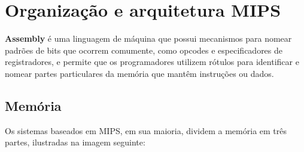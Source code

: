 \documentclass[
	12pt,				%
	oneside,			%
	a4paper,			%
	english,			%
	brazil				%
	]{abntex2ppgsi}
\begin{document}
\frenchspacing 


%
% 
%
\imprimircapa

\tableofcontents*
\cleardoublepage



\textual



% 
%
%
\chapter{Organização e arquitetura MIPS}
\textbf{Assembly} é uma linguagem de máquina que possui mecanismos para nomear padrões de bits que ocorrem comumente, como opcodes e especificadores de registradores, e permite que os programadores utilizem rótulos para identificar e nomear partes particulares da memória que mantêm instruções ou dados. 

\section{Memória}
Os sistemas baseados em MIPS, em sua maioria, dividem a memória em três partes, ilustradas na imagem seguinte:
\end{document}
